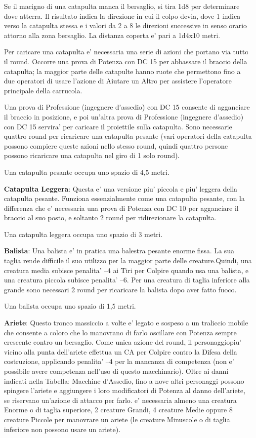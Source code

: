 \documentclass[a4paper,11pt,twoside,openany]{book}
\begin{document}
Se il macigno di una catapulta manca il bersaglio, si tira 1d8 per determinare dove atterra. Il risultato indica la direzione in cui il colpo devia, dove 1 indica verso la catapulta stessa e i valori da 2 a 8 le direzioni successive in senso orario attorno alla zona bersaglio. La distanza coperta e' pari a 1d4x10 metri.

Per caricare una catapulta e' necessaria una serie di azioni che portano via tutto il round. Occorre una prova di Potenza con DC 15 per abbassare il braccio della catapulta; la maggior parte delle catapulte hanno ruote che permettono fino a due operatori di usare l'azione di Aiutare un Altro per assistere l'operatore principale della carrucola.

Una prova di Professione (ingegnere d'assedio) con DC 15 consente di agganciare il braccio in posizione, e poi un'altra prova di Professione (ingegnere d'assedio) con DC 15 servira' per caricare il proiettile sulla catapulta. Sono necessarie quattro round per ricaricare una catapulta pesante (vari operatori della catapulta possono compiere queste azioni nello stesso round, quindi quattro persone possono ricaricare una catapulta nel giro di 1 solo round).

Una catapulta pesante occupa uno spazio di 4,5 metri.

\textbf{Catapulta Leggera}: Questa e' una versione piu' piccola e piu' leggera della catapulta pesante. Funziona essenzialmente come una catapulta pesante, con la differenza che e' necessaria una prova di Potenza con DC 10 per agganciare il braccio al suo posto, e soltanto 2 round per ridirezionare la catapulta.

Una catapulta leggera occupa uno spazio di 3 metri.

\textbf{Balista}: Una balista e' in pratica una balestra pesante enorme fissa. La sua taglia rende difficile il suo utilizzo per la maggior parte delle creature.Quindi, una creatura media subisce penalita' --4 ai Tiri per Colpire quando usa una balista, e una creatura piccola subisce penalita' --6. Per una creatura di taglia inferiore alla grande sono necessari 2 round per ricaricare la balista dopo aver fatto fuoco.

Una balista occupa uno spazio di 1,5 metri.

\textbf{Ariete}: Questo tronco massiccio a volte e' legato e sospeso a un traliccio mobile che consente a coloro che lo manovrano di farlo oscillare con Potenza sempre crescente contro un bersaglio. Come unica azione del round, il personaggiopiu' vicino alla punta dell'ariete effettua un CA per Colpire contro la Difesa della costruzione, applicando penalita' --4 per la mancanza di competenza (non e' possibile avere competenza nell'uso di questo macchinario). Oltre ai danni indicati nella Tabella: Macchine d'Assedio, fino a nove altri personaggi possono spingere l'ariete e aggiungere i loro modificatori di Potenza al danno dell'ariete, se riservano un'azione di attacco per farlo. e' necessaria almeno una creatura Enorme o di taglia superiore, 2 creature Grandi, 4 creature Medie oppure 8 creature Piccole per manovrare un ariete (le creature Minuscole o di taglia inferiore non possono usare un ariete).
\end{document}
